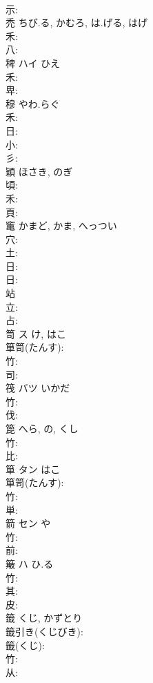 \documentclass[8pt]{extreport}
\begin{document}
\begin{CJK}{UTF8}{min}
\\	示: 
\\	禿		ちび.る, かむろ, は.げる, はげ			
\\	禾: 
\\	八: 
\\	稗	ハイ	ひえ		
\\	禾: 
\\	卑: 
\\	穆		やわ.らぐ			
\\	禾: 
\\	日: 
\\	小: 
\\	彡: 
\\	穎		ほさき, のぎ			
\\	頃: 
\\	禾: 
\\	頁: 
\\	竃		かまど, かま, へっつい			
\\	穴: 
\\	土: 
\\	日: 
\\	日: 
\\	站					
\\	立: 
\\	占: 
\\	笥	ス	け, はこ		
\\	箪笥(たんす): 
\\	竹: 
\\	司: 
\\	筏	バツ	いかだ		
\\	竹: 
\\	伐: 
\\	箆		へら, の, くし			
\\	竹: 
\\	比: 
\\	箪	タン	はこ		
\\	箪笥(たんす): 
\\	竹: 
\\	単: 
\\	箭	セン	や		
\\	竹: 
\\	前: 
\\	簸	ハ	ひ.る		
\\	竹: 
\\	其: 
\\	皮: 
\\	籤		くじ, かずとり			
\\	籤引き(くじびき): 
\\	籤(くじ): 
\\	竹: 
\\	从: 

\end{CJK}
\end{document}
